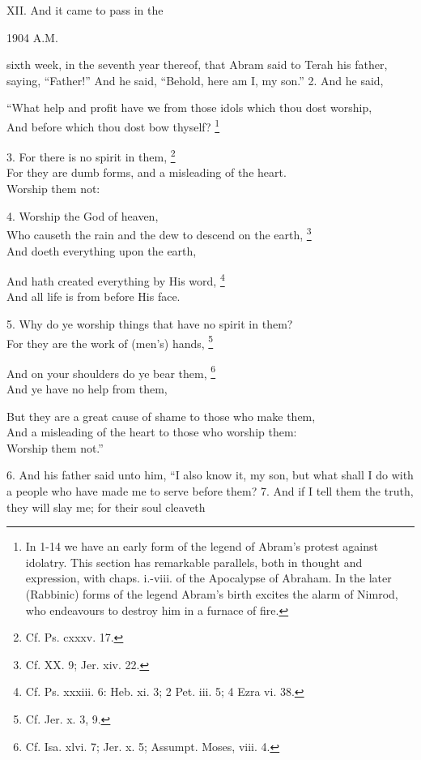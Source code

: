 
XII. And it came to pass in the

1904 A.M.

sixth week, in the seventh year thereof, that Abram said to Terah his father, saying, ``Father!'' And he said, ``Behold, here am I, my son.'' 2. And he said,

``What help and profit have we from those idols which thou dost worship,\\
And before which thou dost bow thyself? \footnote{In 1-14 we have an early form of the legend of Abram's protest against idolatry. This section has remarkable parallels, both in thought and expression, with chaps. i.-viii. of the Apocalypse of Abraham. In the later (Rabbinic) forms of the legend Abram's birth excites the alarm of Nimrod, who endeavours to destroy him in a furnace of fire.}

3. For there is no spirit in them, \footnote{Cf. Ps. cxxxv. 17.}\\
For they are dumb forms, and a misleading of the heart.\\
Worship them not:

4. Worship the God of heaven,\\
Who causeth the rain and the dew to descend on the earth, \footnote{Cf. XX. 9; Jer. xiv. 22.}\\
And doeth everything upon the earth,

And hath created everything by His word, \footnote{Cf. Ps. xxxiii. 6: Heb. xi. 3; 2 Pet. iii. 5; 4 Ezra vi. 38.}\\
And all life is from before His face.

5. Why do ye worship things that have no spirit in them?\\
For they are the work of (men's) hands, \footnote{Cf. Jer. x. 3, 9.}

And on your shoulders do ye bear them, \footnote{Cf. Isa. xlvi. 7; Jer. x. 5; Assumpt. Moses, viii. 4.}\\
And ye have no help from them,

But they are a great cause of shame to those who make them,\\
And a misleading of the heart to those who worship them:\\
Worship them not.''

6. And his father said unto him, ``I also know it, my son, but what shall I do with a people who have made me to serve before them? 7. And if I tell them the truth, they will slay me; for their soul cleaveth

